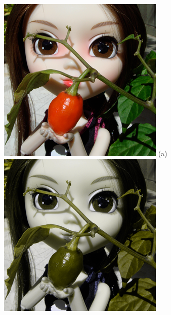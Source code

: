 \documentclass[	12pt, Times, openright, twoside, a4paper, english, brazil]{abntex2}
\begin{document}
\begin{figure}[!htb]
\centering
{\includegraphics[width=\linewidth]{figuraSimuladorOriginal.png}}
(a)
\endminipage\hfill
{}
\centering
{\includegraphics[width=\linewidth]{figuraSimuladorProtan.png}}

\end{figure}
\end{document}
